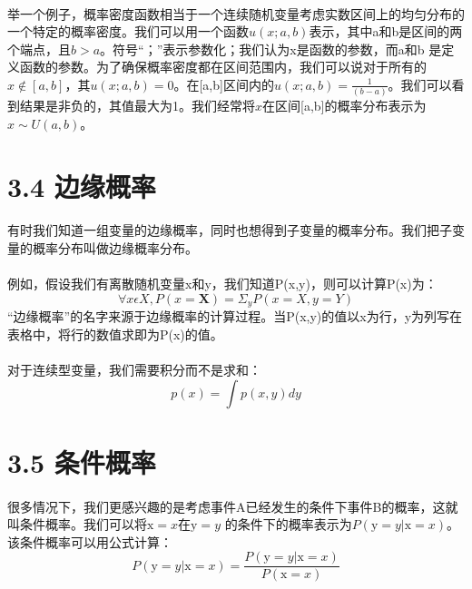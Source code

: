 \documentclass{article}
\begin{document}
    \paragraph{}
    举一个例子，概率密度函数相当于一个连续随机变量考虑实数区间上的均匀分布的一个特定的概率密度。我们可以用一个函数$u(x;a,b)$表示，其中a和b是区间的两个端点，且$b> a$。符号“；”表示参数化；我们认为x是函数的参数，而a和b 是定义函数的参数。为了确保概率密度都在区间范围内，我们可以说对于所有的$x\not\in[a,b]$，其$u(x;a,b)=0$。在[a,b]区间内的$u(x;a,b)=\frac{1}{(b-a)}$。我们可以看到结果是非负的，其值最大为1。我们经常将$x$在区间[a,b]的概率分布表示为$x \sim U(a, b)$。


    \section*{3.4 边缘概率}
    \paragraph{}
    有时我们知道一组变量的边缘概率，同时也想得到子变量的概率分布。我们把子变量的概率分布叫做边缘概率分布。
    \paragraph{}
    例如，假设我们有离散随机变量x和y，我们知道P(x,y)，则可以计算P(x)为：
    \begin{equation}
     \forall x \epsilon X,P(x=\textbf{X})=\Sigma_yP(x=X,y=Y)  \tag{3.3}
    \end{equation}
    “边缘概率”的名字来源于边缘概率的计算过程。当P(x,y)的值以x为行，y为列写在表格中，将行的数值求即为P(x)的值。
    \paragraph{}
    对于连续型变量，我们需要积分而不是求和：
    \begin{equation}
      p(x)=\int p(x,y)dy  \tag{3.4}
    \end{equation}


     \section*{3.5 条件概率}
    \paragraph{}
    很多情况下，我们更感兴趣的是考虑事件A已经发生的条件下事件B的概率，这就叫条件概率。我们可以将$\mathrm{x}=x$在$\mathrm{y}=y$ 的条件下的概率表示为$P(\mathrm{y} = y | \mathrm{x} = x)$。该条件概率可以用公式计算：
    \begin{equation}
      P(\mathrm{y} = y | \mathrm{x} = x)=\frac{P(\mathrm{y} = y | \mathrm{x} = x)}{P( \mathrm{x} = x)} \tag{3.5}
    \end{equation}
\end{document}
